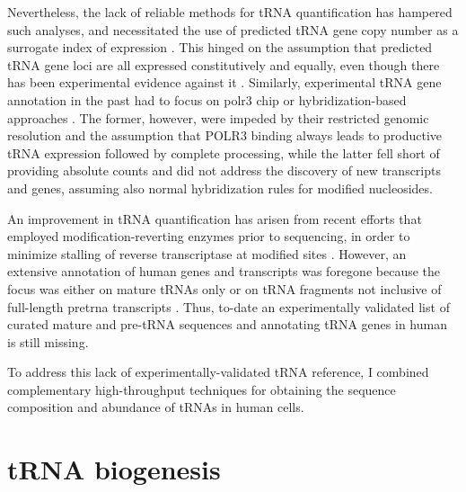 \documentclass[12pt]{rockefeller}
\begin{document}
Nevertheless, the lack of reliable methods for tRNA quantification has hampered such analyses, and necessitated the use of predicted tRNA gene copy number as a surrogate index of expression \cite{Iben:2014dt,Pechmann:2012ey,Tuller:2010ge}. This hinged on the assumption that predicted tRNA gene loci are all expressed constitutively and equally, even though there has been experimental evidence against it \cite{Gingold:2014iz}. Similarly, experimental tRNA gene annotation in the past had to focus on \gls{polr3} \gls{chip} \cite{Moqtaderi:2010hc, Oler:2010fb, Kutter:2011ff} or hybridization-based approaches \cite{Dittmar:2004fb, Goodarzi:2016gd}. The former, however, were impeded by their restricted genomic resolution and the assumption that POLR3 binding always leads to productive tRNA expression followed by complete processing, while the latter fell short of providing absolute counts and did not address the discovery of new transcripts and genes, assuming also normal hybridization rules for modified nucleosides.

An improvement in tRNA quantification has arisen from recent efforts that employed modification-reverting enzymes prior to sequencing, in order to minimize stalling of reverse transcriptase at modified sites \cite{Cozen:2015ds, Zheng:2015dw}. However, an extensive annotation of human genes and transcripts was foregone because the focus was either on mature tRNAs only \cite{Zheng:2015dw} or on tRNA fragments not inclusive of full-length \gls{pretrna} transcripts \cite{Cozen:2015ds}. Thus, to-date an experimentally validated list of curated mature and pre-tRNA sequences and annotating tRNA genes in human is still missing.

To address this lack of experimentally-validated tRNA reference, I combined complementary high-throughput techniques for obtaining the sequence composition and abundance of tRNAs in human cells. 

\section{tRNA biogenesis}\label{biogenesis}
\end{document}
